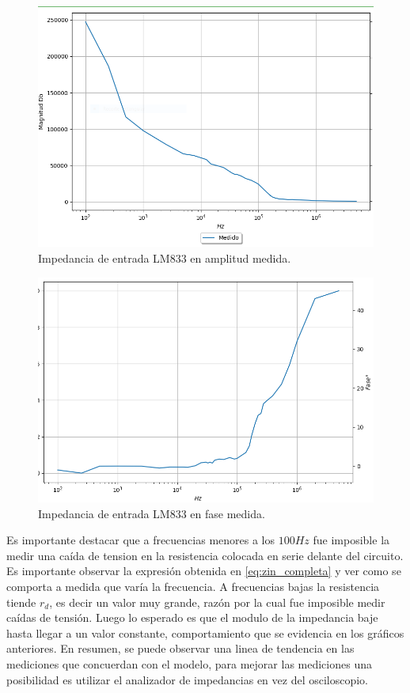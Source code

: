\begin{figure}[H]	
	\centering
	\includegraphics[width=\textwidth]{Ejercicio2/Imagenes/Zin_A_LM833_Medido.png}
	\caption{Impedancia de entrada LM833 en amplitud medida.}
\end{figure}

\begin{figure}[H]	
	\centering
	\includegraphics[width=\textwidth]{Ejercicio2/Imagenes/Zin_F_LM833_Medido.png}
	\caption{Impedancia de entrada LM833 en fase medida.}
\end{figure}

Es importante destacar que a frecuencias menores a los $100 Hz$ fue imposible la medir una caída de tension en la resistencia colocada en serie delante del circuito. Es importante observar la expresión obtenida en \ref{eq:zin_completa} y ver como se comporta a medida que varía la frecuencia. A frecuencias bajas la resistencia tiende $r_d$, es decir un valor muy grande, razón por la cual fue imposible medir caídas de tensión. Luego lo esperado es que el modulo de la impedancia baje hasta llegar a un valor constante, comportamiento que se evidencia en los gráficos anteriores. En resumen, se puede observar una linea de tendencia en las mediciones que concuerdan con el modelo, para mejorar las mediciones una posibilidad es utilizar el analizador de impedancias en vez del osciloscopio.


